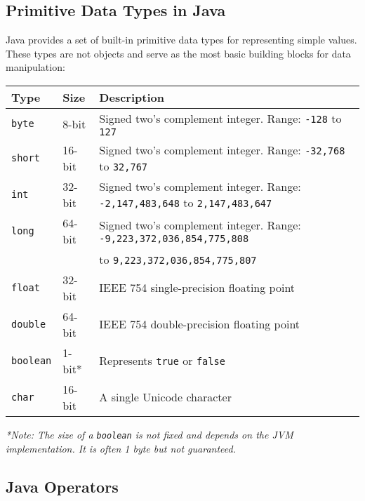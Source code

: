 \documentclass{article}
\begin{document}
\subsection{Primitive Data Types in Java}

Java provides a set of built-in primitive data types for representing simple values. These types are not objects and serve as the most basic building blocks for data manipulation:

\begin{table}[h!]
\centering
\begin{tabular}{@{}lll@{}}
\toprule
\textbf{Type} & \textbf{Size} & \textbf{Description} \\
\midrule
\texttt{byte}   & 8-bit   & Signed two’s complement integer. Range: \texttt{-128} to \texttt{127} \\
\texttt{short}  & 16-bit  & Signed two’s complement integer. Range: \texttt{-32,768} to \texttt{32,767} \\
\texttt{int}    & 32-bit  & Signed two’s complement integer. Range: \texttt{-2,147,483,648} to \texttt{2,147,483,647} \\
\texttt{long}   & 64-bit  & Signed two’s complement integer. Range: \texttt{-9,223,372,036,854,775,808} \\
                &         & to \texttt{9,223,372,036,854,775,807} \\
\texttt{float}  & 32-bit  & IEEE 754 single-precision floating point \\
\texttt{double} & 64-bit  & IEEE 754 double-precision floating point \\
\texttt{boolean}& 1-bit*  & Represents \texttt{true} or \texttt{false} \\
\texttt{char}   & 16-bit  & A single Unicode character \\
\bottomrule
\end{tabular}
\end{table}
\textit{*Note: The size of a \texttt{boolean} is not fixed and depends on the JVM implementation. It is often 1 byte but not guaranteed.}

\subsection{Java Operators}
\end{document}
